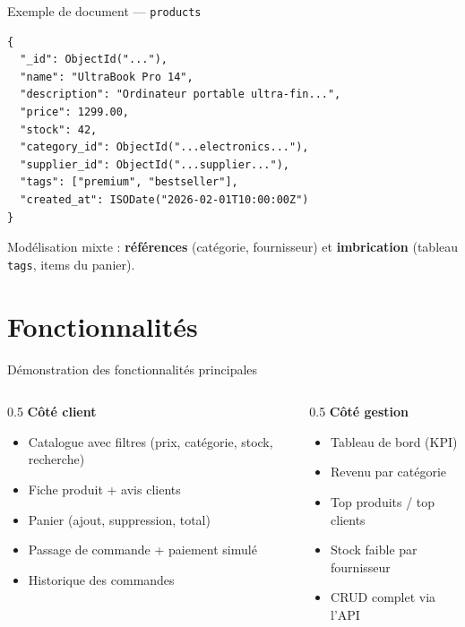 \documentclass[aspectratio=169]{beamer}
\begin{document}
\begin{frame}[fragile]{Exemple de document — \texttt{products}}
\begin{lstlisting}
{
  "_id": ObjectId("..."),
  "name": "UltraBook Pro 14",
  "description": "Ordinateur portable ultra-fin...",
  "price": 1299.00,
  "stock": 42,
  "category_id": ObjectId("...electronics..."),
  "supplier_id": ObjectId("...supplier..."),
  "tags": ["premium", "bestseller"],
  "created_at": ISODate("2026-02-01T10:00:00Z")
}
\end{lstlisting}
  \footnotesize Modélisation mixte : \textbf{références} (catégorie, fournisseur) et \textbf{imbrication} (tableau \texttt{tags}, items du panier).
\end{frame}

\section{Fonctionnalités}
\begin{frame}{Démonstration des fonctionnalités principales}
  \begin{columns}
    \begin{column}{0.5\textwidth}
      \textbf{Côté client}
      \begin{itemize}\footnotesize
        \item Catalogue avec filtres (prix, catégorie, stock, recherche)
        \item Fiche produit + avis clients
        \item Panier (ajout, suppression, total)
        \item Passage de commande + paiement simulé
        \item Historique des commandes
      \end{itemize}
    \end{column}
    \begin{column}{0.5\textwidth}
      \textbf{Côté gestion}
      \begin{itemize}\footnotesize
        \item Tableau de bord (KPI)
        \item Revenu par catégorie
        \item Top produits / top clients
        \item Stock faible par fournisseur
        \item CRUD complet via l'API
      \end{itemize}
    \end{column}
  \end{columns}
\end{frame}
\end{document}
